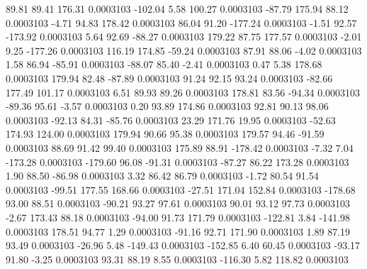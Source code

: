        89.81       89.41      176.31     0.0003103
     -102.04        5.58      100.27     0.0003103
      -87.79      175.94       88.12     0.0003103
       -4.71       94.83      178.42     0.0003103
       86.04       91.20     -177.24     0.0003103
       -1.51       92.57     -173.92     0.0003103
        5.64       92.69      -88.27     0.0003103
      179.22       87.75      177.57     0.0003103
       -2.01        9.25     -177.26     0.0003103
      116.19      174.85      -59.24     0.0003103
       87.91       88.06       -4.02     0.0003103
        1.58       86.94      -85.91     0.0003103
      -88.07       85.40       -2.41     0.0003103
        0.47        5.38      178.68     0.0003103
      179.94       82.48      -87.89     0.0003103
       91.24       92.15       93.24     0.0003103
      -82.66      177.49      101.17     0.0003103
        6.51       89.93       89.26     0.0003103
      178.81       83.56      -94.34     0.0003103
      -89.36       95.61       -3.57     0.0003103
        0.20       93.89      174.86     0.0003103
       92.81       90.13       98.06     0.0003103
      -92.13       84.31      -85.76     0.0003103
       23.29      171.76       19.95     0.0003103
      -52.63      174.93      124.00     0.0003103
      179.94       90.66       95.38     0.0003103
      179.57       94.46      -91.59     0.0003103
       88.69       91.42       99.40     0.0003103
      175.89       88.91     -178.42     0.0003103
       -7.32        7.04     -173.28     0.0003103
     -179.60       96.08      -91.31     0.0003103
      -87.27       86.22      173.28     0.0003103
        1.90       88.50      -86.98     0.0003103
        3.32       86.42       86.79     0.0003103
       -1.72       80.54       91.54     0.0003103
      -99.51      177.55      168.66     0.0003103
      -27.51      171.04      152.84     0.0003103
     -178.68       93.00       88.51     0.0003103
      -90.21       93.27       97.61     0.0003103
       90.01       93.12       97.73     0.0003103
       -2.67      173.43       88.18     0.0003103
      -94.00       91.73      171.79     0.0003103
     -122.81        3.84     -141.98     0.0003103
      178.51       94.77        1.29     0.0003103
      -91.16       92.71      171.90     0.0003103
        1.89       87.19       93.49     0.0003103
      -26.96        5.48     -149.43     0.0003103
     -152.85        6.40       60.45     0.0003103
      -93.17       91.80       -3.25     0.0003103
       93.31       88.19        8.55     0.0003103
     -116.30        5.82      118.82     0.0003103
